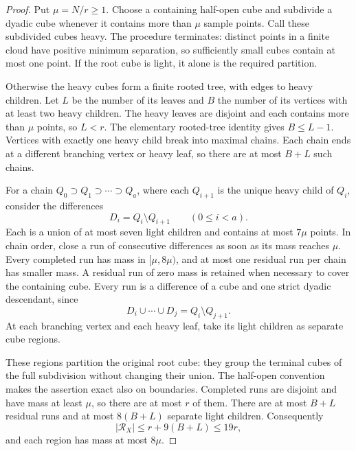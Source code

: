 \begin{proof}
Put \(\mu=N/r\ge1\).  Choose a containing half-open cube and
subdivide a dyadic cube whenever it contains more than \(\mu\)
sample points.  Call these subdivided cubes heavy.  The procedure
terminates: distinct points in a finite cloud have positive minimum
separation, so sufficiently small cubes contain at most one point.
If the root cube is light, it alone is the required partition.

Otherwise the heavy cubes form a finite rooted tree, with edges to
heavy children.  Let \(L\) be the number of its leaves and \(B\)
the number of its vertices with at least two heavy children.
The heavy leaves are disjoint and each contains more than \(\mu\)
points, so \(L<r\).  The elementary rooted-tree identity gives
\(B\le L-1\).  Vertices with exactly one heavy child break into
maximal chains.  Each chain ends at a different branching vertex
or heavy leaf, so there are at most \(B+L\) such chains.

For a chain \(Q_0\supset Q_1\supset\cdots\supset Q_a\), where
each \(Q_{i+1}\) is the unique heavy child of \(Q_i\), consider
the differences
\[
 D_i=Q_i\setminus Q_{i+1}\qquad(0\le i<a).
\]
Each is a union of at most seven light children and contains at
most \(7\mu\) points.  In chain order, close a run of consecutive
differences as soon as its mass reaches \(\mu\).  Every completed
run has mass in \([\mu,8\mu)\), and at most one residual run per
chain has smaller mass.  A residual run of zero mass is retained
when necessary to cover the containing cube.  Every run is a
difference of a cube and one strict dyadic descendant, since
\[
 D_i\cup\cdots\cup D_j=Q_i\setminus Q_{j+1}.
\]
At each branching vertex and each heavy leaf, take its light
children as separate cube regions.

These regions partition the original root cube: they group the
terminal cubes of the full subdivision without changing their
union.  The half-open convention makes the assertion exact also on
boundaries.  Completed runs are disjoint and have mass at least
\(\mu\), so there are at most \(r\) of them.  There are at most
\(B+L\) residual runs and at most \(8(B+L)\) separate light
children.  Consequently
\[
 |\mathcal R_X|\le r+9(B+L)\le19r,
\]
and each region has mass at most \(8\mu\).


\end{proof}
